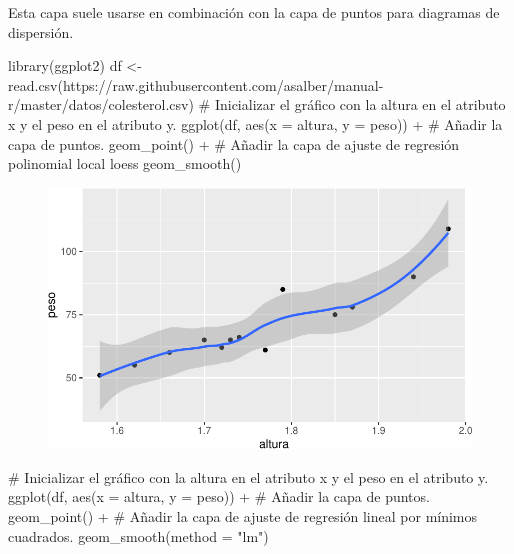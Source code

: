 \documentclass[
  a4paper,
]{scrreport}
\newenvironment{Shaded}{\begin{snugshade}}{\end{snugshade}}
\newcommand{\AttributeTok}[1]{\textcolor[rgb]{0.40,0.45,0.13}{#1}}
\newcommand{\CommentTok}[1]{\textcolor[rgb]{0.37,0.37,0.37}{#1}}
\newcommand{\FunctionTok}[1]{\textcolor[rgb]{0.28,0.35,0.67}{#1}}
\newcommand{\NormalTok}[1]{\textcolor[rgb]{0.00,0.23,0.31}{#1}}
\newcommand{\OtherTok}[1]{\textcolor[rgb]{0.00,0.23,0.31}{#1}}
\newcommand{\SpecialCharTok}[1]{\textcolor[rgb]{0.37,0.37,0.37}{#1}}
\newcommand{\StringTok}[1]{\textcolor[rgb]{0.13,0.47,0.30}{#1}}
\theoremstyle{definition}
\theoremstyle{definition}
\theoremstyle{remark}
\begin{document}
Esta capa suele usarse en combinación con la capa de puntos para
diagramas de dispersión.

\begin{Shaded}
\begin{Highlighting}[]
\FunctionTok{library}\NormalTok{(ggplot2)}
\NormalTok{df }\OtherTok{\textless{}{-}} \FunctionTok{read.csv}\NormalTok{(}\StringTok{\textquotesingle{}https://raw.githubusercontent.com/asalber/manual{-}r/master/datos/colesterol.csv\textquotesingle{}}\NormalTok{)}
\CommentTok{\# Inicializar el gráfico con la altura en el atributo x y el peso en el atributo y.}
\FunctionTok{ggplot}\NormalTok{(df, }\FunctionTok{aes}\NormalTok{(}\AttributeTok{x =}\NormalTok{ altura, }\AttributeTok{y =}\NormalTok{ peso)) }\SpecialCharTok{+}
\CommentTok{\# Añadir la capa de puntos.}
    \FunctionTok{geom\_point}\NormalTok{() }\SpecialCharTok{+}
\CommentTok{\# Añadir la capa de ajuste de regresión polinomial local loess}
    \FunctionTok{geom\_smooth}\NormalTok{()}
\end{Highlighting}
\end{Shaded}

\begin{figure}[H]

{\centering \includegraphics{./07-graficos_files/figure-pdf/unnamed-chunk-24-1.pdf}

}

\end{figure}

\begin{Shaded}
\begin{Highlighting}[]
\CommentTok{\# Inicializar el gráfico con la altura en el atributo x y el peso en el atributo y.}
\FunctionTok{ggplot}\NormalTok{(df, }\FunctionTok{aes}\NormalTok{(}\AttributeTok{x =}\NormalTok{ altura, }\AttributeTok{y =}\NormalTok{ peso)) }\SpecialCharTok{+}
\CommentTok{\# Añadir la capa de puntos.}
    \FunctionTok{geom\_point}\NormalTok{() }\SpecialCharTok{+}
\CommentTok{\# Añadir la capa de ajuste de regresión lineal por mínimos cuadrados.}
    \FunctionTok{geom\_smooth}\NormalTok{(}\AttributeTok{method =} \StringTok{"lm"}\NormalTok{)}
\end{Highlighting}
\end{Shaded}
\end{document}
